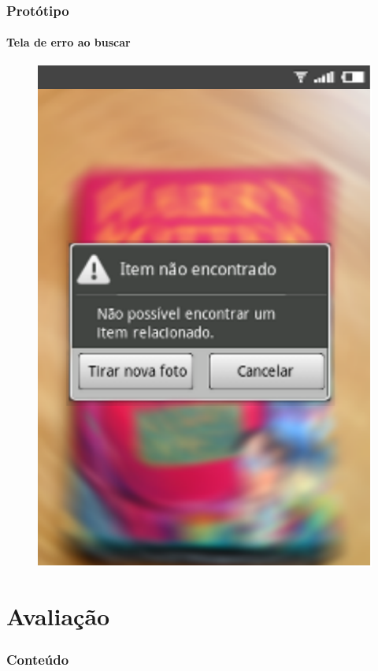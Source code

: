 \documentclass[14pt,beamer]{beamer}
\begin{document}
\begin{frame}
	\frametitle{Protótipo}
	\framesubtitle{Tela de erro ao buscar}

    \begin{figure}
        \centering
        \includegraphics[scale=.71]{tela/TelaErro}
    \end{figure}
\end{frame}

\section{Avaliação}

\begin{frame}
	\frametitle{Conteúdo}
    \begin{multicols}{2}
        \footnotesize
    \end{multicols}
\end{frame}
\end{document}
